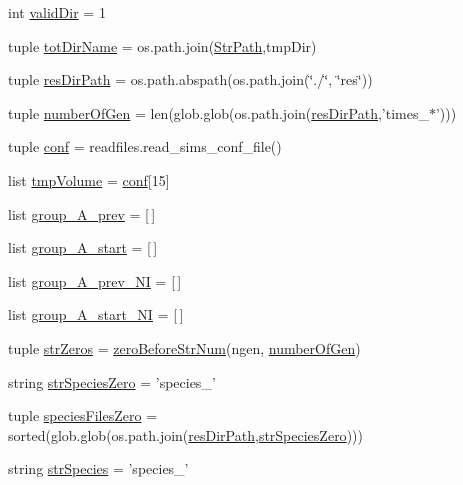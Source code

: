 \begin{DoxyCompactItemize}
\item 
int \hyperlink{a00130_aebb18ab2b73e7e2705ee42c728c0a72b}{valid\-Dir} = 1
\item 
tuple \hyperlink{a00130_af4bd99f6cdaec32f48ed0074208b4f0c}{tot\-Dir\-Name} = os.\-path.\-join(\hyperlink{a00130_ac34f3f43f888eb6620266d78ce928ceb}{Str\-Path},tmp\-Dir)
\item 
tuple \hyperlink{a00130_ab3da7da39258338965b6eef645a913ee}{res\-Dir\-Path} = os.\-path.\-abspath(os.\-path.\-join(\char`\"{}./\char`\"{}, \char`\"{}res\char`\"{}))
\item 
tuple \hyperlink{a00130_a54acb4eba0735e72c2a820383febd37f}{number\-Of\-Gen} = len(glob.\-glob(os.\-path.\-join(\hyperlink{a00130_ab3da7da39258338965b6eef645a913ee}{res\-Dir\-Path},'times\-\_\-$\ast$')))
\item 
tuple \hyperlink{a00130_ab8d1341009c3207d501833ef63593ffa}{conf} = readfiles.\-read\-\_\-sims\-\_\-conf\-\_\-file()
\item 
list \hyperlink{a00130_a1d189b8706c1c2299764d3cfd2ba08d9}{tmp\-Volume} = \hyperlink{a00130_ab8d1341009c3207d501833ef63593ffa}{conf}\mbox{[}15\mbox{]}
\item 
list \hyperlink{a00130_a1dd2f2c85f697e454c99be1a157d6c17}{group\-\_\-\-A\-\_\-prev} = \mbox{[}$\,$\mbox{]}
\item 
list \hyperlink{a00130_a3898175300d001a17a60c23656d2812f}{group\-\_\-\-A\-\_\-start} = \mbox{[}$\,$\mbox{]}
\item 
list \hyperlink{a00130_a4d77133a6a303d9486944707f3310cf8}{group\-\_\-\-A\-\_\-prev\-\_\-\-N\-I} = \mbox{[}$\,$\mbox{]}
\item 
list \hyperlink{a00130_aedb746884c5ae6e301c8ad2d8307fe4d}{group\-\_\-\-A\-\_\-start\-\_\-\-N\-I} = \mbox{[}$\,$\mbox{]}
\item 
tuple \hyperlink{a00130_a292c23aa303304f24632662a5dfbfa23}{str\-Zeros} = \hyperlink{a00130_aeeb6d629132a9755b45a3008d445419c}{zero\-Before\-Str\-Num}(ngen, \hyperlink{a00130_a54acb4eba0735e72c2a820383febd37f}{number\-Of\-Gen})
\item 
string \hyperlink{a00130_a52f7239b2be2cb978182547960b6c46e}{str\-Species\-Zero} = 'species\-\_\-'
\item 
tuple \hyperlink{a00130_a5584994da277e7798c904342dff18427}{species\-Files\-Zero} = sorted(glob.\-glob(os.\-path.\-join(\hyperlink{a00130_ab3da7da39258338965b6eef645a913ee}{res\-Dir\-Path},\hyperlink{a00130_a52f7239b2be2cb978182547960b6c46e}{str\-Species\-Zero})))
\item 
string \hyperlink{a00130_ab14d209fe558e83aeede3b657a7241bb}{str\-Species} = 'species\-\_\-'

\end{DoxyCompactItemize}
